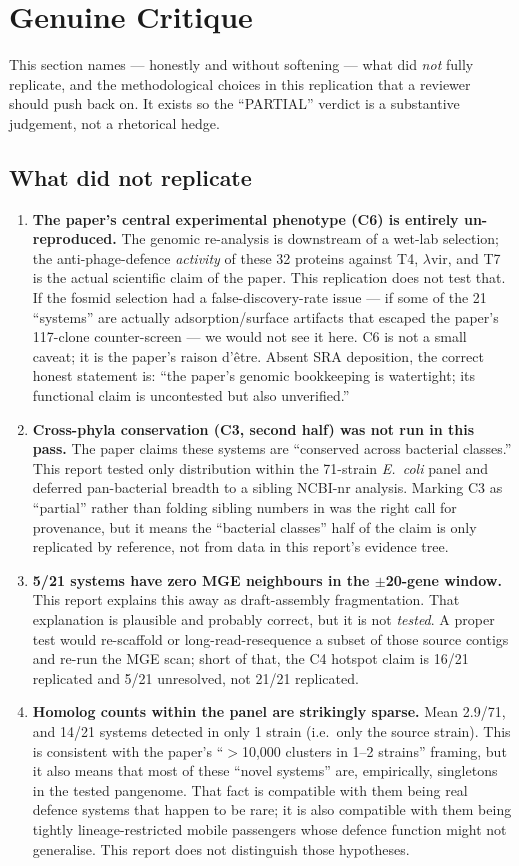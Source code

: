 \documentclass[11pt,letterpaper]{article}
\begin{document}
\section{Genuine Critique}
This section names --- honestly and without softening --- what did \textit{not} fully replicate, and the methodological choices in this replication that a reviewer should push back on. It exists so the ``PARTIAL'' verdict is a substantive judgement, not a rhetorical hedge.

\subsection*{What did not replicate}
\begin{enumerate}
\item \textbf{The paper's central experimental phenotype (C6) is entirely un-reproduced.} The genomic re-analysis is downstream of a wet-lab selection; the anti-phage-defence \textit{activity} of these 32 proteins against T4, $\lambda$vir, and T7 is the actual scientific claim of the paper. This replication does not test that. If the fosmid selection had a false-discovery-rate issue --- if some of the 21 ``systems'' are actually adsorption/surface artifacts that escaped the paper's 117-clone counter-screen --- we would not see it here. C6 is not a small caveat; it is the paper's raison d'\^etre. Absent SRA deposition, the correct honest statement is: ``the paper's genomic bookkeeping is watertight; its functional claim is uncontested but also unverified.''
\item \textbf{Cross-phyla conservation (C3, second half) was not run in this pass.} The paper claims these systems are ``conserved across bacterial classes.'' This report tested only distribution within the 71-strain \textit{E.\ coli} panel and deferred pan-bacterial breadth to a sibling NCBI-nr analysis. Marking C3 as ``partial'' rather than folding sibling numbers in was the right call for provenance, but it means the ``bacterial classes'' half of the claim is only replicated by reference, not from data in this report's evidence tree.
\item \textbf{5/21 systems have zero MGE neighbours in the $\pm$20-gene window.} This report explains this away as draft-assembly fragmentation. That explanation is plausible and probably correct, but it is not \textit{tested}. A proper test would re-scaffold or long-read-resequence a subset of those source contigs and re-run the MGE scan; short of that, the C4 hotspot claim is 16/21 replicated and 5/21 unresolved, not 21/21 replicated.
\item \textbf{Homolog counts within the panel are strikingly sparse.} Mean 2.9/71, and 14/21 systems detected in only 1 strain (i.e.\ only the source strain). This is consistent with the paper's ``$>$10{,}000 clusters in 1--2 strains'' framing, but it also means that most of these ``novel systems'' are, empirically, singletons in the tested pangenome. That fact is compatible with them being real defence systems that happen to be rare; it is also compatible with them being tightly lineage-restricted mobile passengers whose defence function might not generalise. This report does not distinguish those hypotheses.
\end{enumerate}
\end{document}

